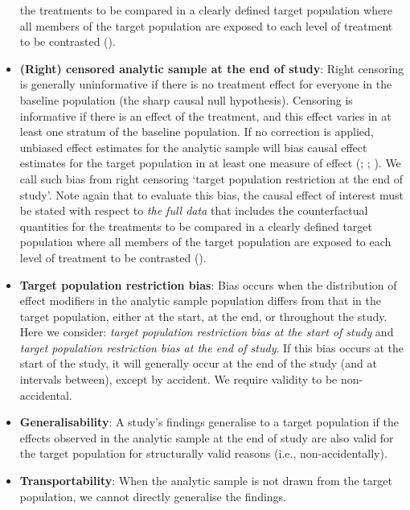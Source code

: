 \documentclass[
  single column]{article}
\begin{document}
\begin{itemize}
  the treatments to be compared in a clearly defined target population
  where all members of the target population are exposed to each level
  of treatment to be contrasted ().
\item
  \textbf{(Right) censored analytic sample at the end of study}: Right
  censoring is generally uninformative if there is no treatment effect
  for everyone in the baseline population (the sharp causal null
  hypothesis). Censoring is informative if there is an effect of the
  treatment, and this effect varies in at least one stratum of the
  baseline population. If no correction is applied, unbiased effect
  estimates for the analytic sample will bias causal effect estimates
  for the target population in at least one measure of effect
  (;
  ;
  ). We call such bias
  from right censoring `target population restriction at the end of
  study'. Note again that to evaluate this bias, the causal effect of
  interest must be stated with respect to \emph{the full data} that
  includes the counterfactual quantities for the treatments to be
  compared in a clearly defined target population where all members of
  the target population are exposed to each level of treatment to be
  contrasted ().
\item
  \textbf{Target population restriction bias}: Bias occurs when the
  distribution of effect modifiers in the analytic sample population
  differs from that in the target population, either at the start, at
  the end, or throughout the study. Here we consider: \emph{target
  population restriction bias at the start of study} and \emph{target
  population restriction bias at the end of study}. If this bias occurs
  at the start of the study, it will generally occur at the end of the
  study (and at intervals between), except by accident. We require
  validity to be non-accidental.
\item
  \textbf{Generalisability}: A study's findings generalise to a target
  population if the effects observed in the analytic sample at the end
  of study are also valid for the target population for structurally
  valid reasons (i.e., non-accidentally).
\item
  \textbf{Transportability}: When the analytic sample is not drawn from
  the target population, we cannot directly generalise the findings.

\end{itemize}
\end{document}

